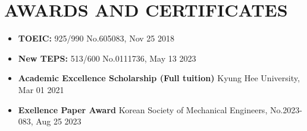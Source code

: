 \documentclass[a4paper,10pt]{extarticle}
\begin{document}
\section*{AWARDS AND CERTIFICATES}
\begin{itemize}
    \item \textbf{TOEIC:} 925/990 \hfill No.605083, Nov 25 2018
    \item \textbf{New TEPS:} 513/600 \hfill No.0111736, May 13 2023
    \item \textbf{Academic Excellence Scholarship (Full tuition)} \hfill Kyung Hee University, Mar 01 2021
    \item \textbf{Exellence Paper Award} \hfill Korean Society of Mechanical Engineers, No.2023-083, Aug 25 2023
\end{itemize}


\end{document}
